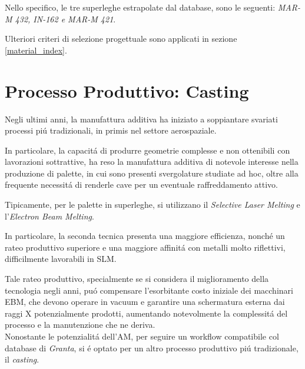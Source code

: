 \documentclass{article}
\begin{document}
        Nello specifico, le tre superleghe estrapolate dal database, sono le seguenti:
        \textit{MAR-M 432, IN-162 e MAR-M 421}.

        Ulteriori criteri di selezione progettuale sono applicati in sezione \ref{material_index}.

    \clearpage

    \section{Processo Produttivo: Casting\label{Casting}}

    Negli ultimi anni, la manufattura additiva ha iniziato a soppiantare svariati 
    processi piú tradizionali, in primis nel settore aerospaziale. 

    In particolare, la capacitá di produrre geometrie complesse e non ottenibili
    con lavorazioni sottrattive, ha reso la manufattura additiva di notevole interesse 
    nella produzione di palette, in cui sono presenti svergolature studiate ad hoc, 
    oltre alla frequente necessitá di renderle cave per un eventuale raffreddamento attivo.

    Tipicamente, per le palette in superleghe, si utilizzano il 
    \textit{Selective Laser Melting} e l'\textit{Electron Beam Melting}.
    
    In particolare, la seconda tecnica presenta una maggiore efficienza, nonché un rateo
    produttivo superiore e una maggiore affinitá con metalli molto
    riflettivi, difficilmente lavorabili
    in SLM.
    
    Tale rateo produttivo, specialmente se si considera il miglioramento della tecnologia
    negli anni, puó compensare l'esorbitante costo iniziale dei macchinari EBM, che devono operare in vacuum
    e garantire una schermatura esterna dai raggi X potenzialmente prodotti, aumentando
    notevolmente la complessitá del processo e la manutenzione che ne deriva. \\ 

    Nonostante le potenzialitá dell'AM, per seguire un workflow compatibile col database di \textit{Granta}, si é optato
    per un altro processo produttivo piú tradizionale, il \textit{casting}. 
\end{document}
